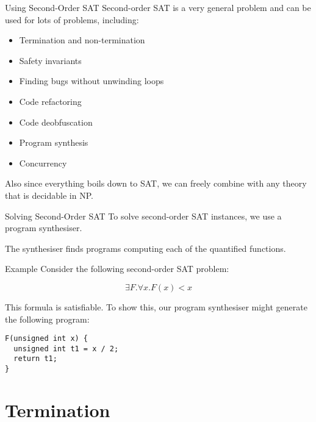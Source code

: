 \documentclass[xcolor=pdftex,t,11pt]{beamer}
\begin{document}
\begin{frame}{Using Second-Order SAT}
 Second-order SAT is a very general problem and can be used for lots of problems, including:
 
 \begin{itemize}
  \item Termination and non-termination
  \item Safety invariants
  \item Finding bugs without unwinding loops
  \item Code refactoring
  \item Code deobfuscation
  \item Program synthesis
  \item Concurrency
 \end{itemize}
 
 Also since everything boils down to SAT, we can freely combine with any theory that is decidable in NP.
\end{frame}

\begin{frame}{Solving Second-Order SAT}
 To solve second-order SAT instances, we use a program synthesiser.

 \vspace{1em}

 The synthesiser finds programs computing each of the quantified functions.
\end{frame}

\begin{frame}[fragile]{Example}
Consider the following second-order SAT problem:

 \[
  \exists F . \forall x . F(x) < x
 \]

This formula is satisfiable.  To show this, our program synthesiser might generate the following program:

\begin{center}
\begin{lstlisting}
F(unsigned int x) {
  unsigned int t1 = x / 2;
  return t1;
}
\end{lstlisting}
\end{center}
\end{frame}

\section{Termination}
\end{document}

